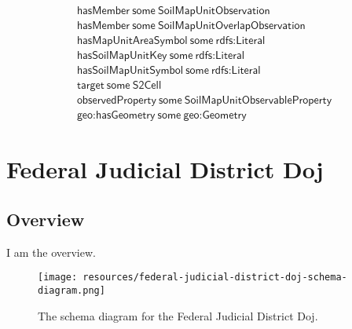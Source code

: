 \begin{align}
  \textsf{hasMember}~\textsf{some}~\textsf{SoilMapUnitObservation}\\
  \textsf{hasMember}~\textsf{some}~\textsf{SoilMapUnitOverlapObservation}\\
  \textsf{hasMapUnitAreaSymbol}~\textsf{some}~\textsf{rdfs:Literal}\\
  \textsf{hasSoilMapUnitKey}~\textsf{some}~\textsf{rdfs:Literal}\\
  \textsf{hasSoilMapUnitSymbol}~\textsf{some}~\textsf{rdfs:Literal}\\
  \textsf{target}~\textsf{some}~\textsf{S2Cell}\\
  \textsf{observedProperty}~\textsf{some}~\textsf{SoilMapUnitObservableProperty}\\
  \textsf{geo:hasGeometry}~\textsf{some}~\textsf{geo:Geometry}\end{align}



\section{Federal Judicial District Doj}
\label{sec:federal-judicial-district-doj}
\subsection{Overview}
\label{ssec:overview}

I am the overview.

\begin{figure}[h!]
  \begin{center}
    \texttt{[image: resources/federal-judicial-district-doj-schema-diagram.png]}
  \end{center}
  \caption{The schema diagram for the Federal Judicial District Doj.}
  \label{fig:ov-diagram}
\end{figure}


